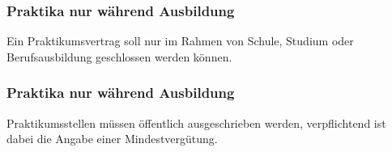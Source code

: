 \subsubsection{Praktika nur während Ausbildung}
\abstimmung
Ein Praktikumsvertrag soll nur im Rahmen von Schule, Studium oder Berufsausbildung geschlossen werden können.

\subsubsection{Praktika nur während Ausbildung}
\abstimmung
Praktikumsstellen müssen öffentlich ausgeschrieben werden, verpflichtend ist dabei die Angabe einer Mindestvergütung.
